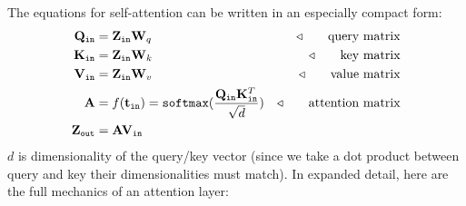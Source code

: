 
The equations for self-attention can be written in an especially compact form:
\begin{align}
    \mathbf{Q}_{\texttt{in}} &= \mathbf{Z}_{\texttt{in}}\mathbf{W}_q &\triangleleft \quad\quad \text{query matrix}\\
    \mathbf{K}_{\texttt{in}} &= \mathbf{Z}_{\texttt{in}}\mathbf{W}_k &\triangleleft \quad\quad \text{key matrix}\\
    \mathbf{V}_{\texttt{in}} &= \mathbf{Z}_{\texttt{in}}\mathbf{W}_v &\triangleleft \quad\quad \text{value matrix}\\
    \mathbf{A} &= f(\mathbf{t}_{\texttt{in}}) = \texttt{softmax}(\frac{\mathbf{Q}_{\texttt{in}}\mathbf{K}_{\texttt{in}}^T}{\sqrt{d}}) &\triangleleft \quad\quad \text{attention matrix}\\
    \mathbf{Z}_{\texttt{out}} &= \mathbf{A}\mathbf{V}_{\texttt{in}}
\end{align}
$d$ is dimensionality of the query/key vector (since we take a dot product between query and key their dimensionalities must match). In expanded detail, here are the full mechanics of an attention layer:
